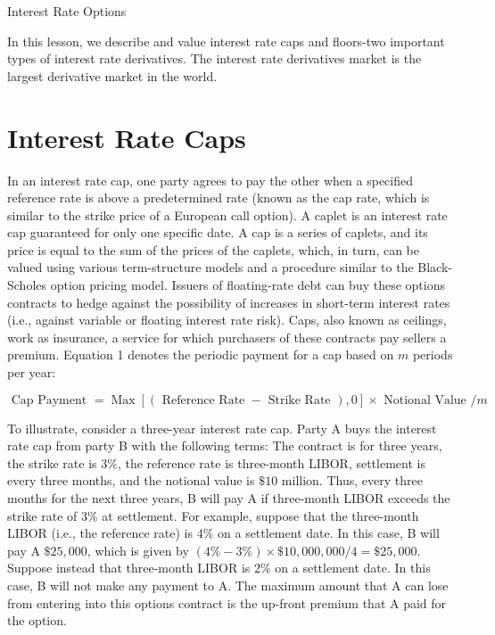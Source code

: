 \documentclass[11pt]{article}
\begin{document}
Interest Rate Options

In this lesson, we describe and value interest rate caps and floors-two important types of interest rate derivatives. The interest rate derivatives market is the largest derivative market in the world.

\section*{Interest Rate Caps}
In an interest rate cap, one party agrees to pay the other when a specified reference rate is above a predetermined rate (known as the cap rate, which is similar to the strike price of a European call option). A caplet is an interest rate cap guaranteed for only one specific date. A cap is a series of caplets, and its price is equal to the sum of the prices of the caplets, which, in turn, can be valued using various term-structure models and a procedure similar to the Black-Scholes option pricing model. Issuers of floating-rate debt can buy these options contracts to hedge against the possibility of increases in short-term interest rates (i.e., against variable or floating interest rate risk). Caps, also known as ceilings, work as insurance, a service for which purchasers of these contracts pay sellers a premium. Equation 1 denotes the periodic payment for a cap based on $m$ periods per year:


\begin{equation*}
\text { Cap Payment }=\operatorname{Max}[(\text { Reference Rate }- \text { Strike Rate }), 0] \times \text { Notional Value } / m \tag{1}
\end{equation*}


To illustrate, consider a three-year interest rate cap. Party A buys the interest rate cap from party B with the following terms: The contract is for three years, the strike rate is $3 \%$, the reference rate is three-month LIBOR, settlement is every three months, and the notional value is $\$ 10$ million. Thus, every three months for the next three years, B will pay A if three-month LIBOR exceeds the strike rate of $3 \%$ at settlement. For example, suppose that the three-month LIBOR (i.e., the reference rate) is $4 \%$ on a settlement date. In this case, B will pay A $\$ 25,000$, which is given by $(4 \%-3 \%) \times \$ 10,000,000 / 4=\$ 25,000$. Suppose instead that three-month LIBOR is $2 \%$ on a settlement date. In this case, B will not make any payment to A. The maximum amount that A can lose from entering into this options contract is the up-front premium that A paid for the option.
\end{document}
